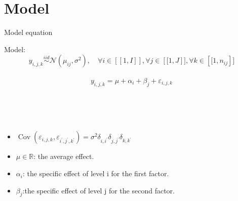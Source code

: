 \documentclass{beamer}
\begin{document}
\section{Model}
\begin{frame}{Model equation}
   
  
  
\begin{alertblock}{Model: }
  $$\left.y_{i, j, k} \stackrel{i i d}{\sim} \mathcal{N}\left(\mu_{i j}, \sigma^{2}\right), \quad \forall i \in[\![1, I]\!] , \forall j \in\left[\![1, J\right]\!] ,\forall k \in\left[\![1, n_{i j}\right]\!]$$\\
 
   $$y_{i, j, k}=\mu+\alpha_{i}+\beta_{j}+\varepsilon_{i, j, k}$$
   
\end {alertblock}
  
  \\ \\ \\
  
  
  \begin{itemize}\\ \\

   \item $\operatorname{Cov}\left(\varepsilon_{i, j, k}, \varepsilon_{i^{\prime}, j^{\prime}, k^{\prime}}\right)=\sigma^{2} \delta_{i, i^{\prime}} \delta_{j, j^{\prime}} \delta_{k, k^{\prime}}$\\
   \item$  \mu \in \mathbb{R}$: the average effect.\\
   \item$\alpha_{i}$: the specific effect of level i for the first factor. \\
   \item$\beta_{j}$:the specific effect of level j for the second factor.
   \end{itemize}
\end{frame}
\end{document}
